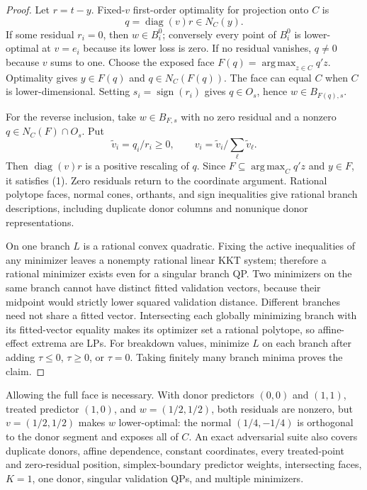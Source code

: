 \documentclass[10pt]{article}
\theoremstyle{definition}
\newcommand{\argmax}{\operatorname*{arg\,max}}
\begin{document}
\begin{proof}
Let $r=t-y$.  Fixed-$v$ first-order optimality for projection onto $C$ is
\[
 q=\operatorname{diag}(v)r\in N_C(y). \tag{1}
\]
If some residual $r_i=0$, then $w\in B_i^0$; conversely every point of
$B_i^0$ is lower-optimal at $v=e_i$ because its lower loss is zero.  If no
residual vanishes, $q\ne0$ because $v$ sums to one.  Choose the exposed face
$F(q)=\argmax_{z\in C}q'z$.  Optimality gives $y\in F(q)$ and
$q\in N_C(F(q))$.  The face can equal $C$ when $C$ is lower-dimensional.
Setting $s_i=\operatorname{sign}(r_i)$ gives $q\in O_s$, hence
$w\in B_{F(q),s}$.

For the reverse inclusion, take $w\in B_{F,s}$ with no zero residual and a
nonzero $q\in N_C(F)\cap O_s$.  Put
\[
 \widetilde v_i=q_i/r_i\ge0,\qquad
 v_i=\widetilde v_i/\sum_\ell\widetilde v_\ell.
\]
Then $\operatorname{diag}(v)r$ is a positive rescaling of $q$.  Since
$F\subseteq\argmax_C q'z$ and $y\in F$, it satisfies (1).  Zero residuals
return to the coordinate argument.  Rational polytope faces, normal cones,
orthants, and sign inequalities give rational branch descriptions, including
duplicate donor columns and nonunique donor representations.

On one branch $L$ is a rational convex quadratic.  Fixing the active
inequalities of any minimizer leaves a nonempty rational linear KKT system;
therefore a rational minimizer exists even for a singular branch QP.  Two
minimizers on the same branch cannot have distinct fitted validation vectors,
because their midpoint would strictly lower squared validation distance.
Different branches need not share a fitted vector.  Intersecting each globally
minimizing branch with its fitted-vector equality makes its optimizer set a
rational polytope, so affine-effect extrema are LPs.  For breakdown values,
minimize $L$ on each branch after adding $\tau\le0$, $\tau\ge0$, or $\tau=0$.
Taking finitely many branch minima proves the claim.
\end{proof}

Allowing the full face is necessary.  With donor predictors $(0,0)$ and
$(1,1)$, treated predictor $(1,0)$, and $w=(1/2,1/2)$, both residuals are
nonzero, but $v=(1/2,1/2)$ makes $w$ lower-optimal: the normal
$(1/4,-1/4)$ is orthogonal to the donor segment and exposes all of $C$.
An exact adversarial suite also covers duplicate donors, affine dependence,
constant coordinates, every treated-point and zero-residual position,
simplex-boundary predictor weights, intersecting faces, $K=1$, one donor,
singular validation QPs, and multiple minimizers.
\end{document}
